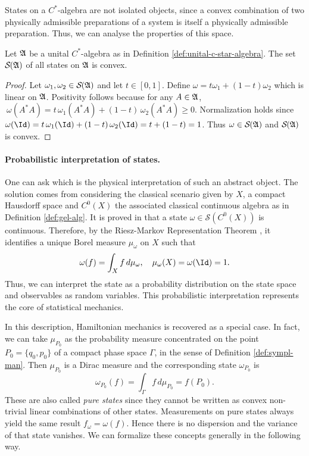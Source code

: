	States on a $C^*$-algebra are not isolated objects, since a convex combination of two physically admissible preparations of a system is itself a physically admissible preparation. Thus, we can analyse the properties of this space.
	
	\begin{proposition}\label{prop:state-convex}
		Let $\mathfrak{A}$ be a unital $C^*$-algebra as in Definition \ref{def:unital-c-star-algebra}. The set $\mathcal{S}(\A)$ of all states on $\mathfrak{A}$ is convex.
	\end{proposition}
	
	\begin{proof}
		Let $\omega_1,\omega_2 \in \mathcal{S}(\A)$ and let $t \in [0,1]$. Define $\omega = t\omega_1 + (1-t)\omega_2$ which is linear on $\mathfrak{A}$. Positivity follows because for any $A\in\mathfrak{A}$, $\ \omega(A^*A) = t\,\omega_1(A^*A) + (1-t)\,\omega_2(A^*A) \ge 0$.
		Normalization holds since $\omega(\Id) = t\,\omega_1(\Id) + (1-t)\,\omega_2(\Id) = t + (1-t) = 1$. Thus $\omega \in \mathcal{S}(\A)$ and $\mathcal{S}(\A)$ is convex.
	\end{proof}
	
	\paragraph{Probabilistic interpretation of states.}
	
	One can ask which is the physical interpretation of such an abstract object. The solution comes from considering the classical scenario given by $X$, a compact Hausdorff space and $C^0(X)$ the associated classical continuous algebra as in Definition \ref{def:gel-alg}. It is proved in \cite[Proposition 2.3.11]{bratteliOperatorAlgebrasQuantum} that a state $\omega \in \mathcal{S}(C^0(X))$ is continuous. Therefore, by the Riesz-Markov Representation Theorem \cite[Theorem IV.14]{reedMethodsModernMathematical2003}, it identifies a unique Borel measure $\mu_\omega$ on $X$ such that
	\begin{equation}
		\omega(f) = \int_X f \, d\mu_\omega, \quad \mu_\omega(X) = \omega(\Id) = 1.
	\end{equation}
	Thus, we can interpret the state as a probability distribution on the state space and observables as random variables. This probabilistic interpretation represents the core of statistical mechanics.
	
	In this description, Hamiltonian mechanics is recovered as a special case. In fact, we can take $\mu_{P_0}$ as the probability measure concentrated on the point $P_0 = \{q_0, p_0\}$ of a compact phase space $\Gamma$, in the sense of Definition \ref{def:sympl-man}. Then $\mu_{P_0}$ is a Dirac measure and the corresponding state $\omega_{P_0}$ is
	\begin{equation}
		\omega_{P_0}(f) = \int_\Gamma f \, d\mu_{P_0} = f(P_0).
	\end{equation}
	These are also called \textit{pure states} since they cannot be written as convex non-trivial linear combinations of other states. Measurements on pure states always yield the same result $f_\omega = \omega(f)$. Hence there is no dispersion and the variance of that state vanishes. We can formalize these concepts generally in the following way.
	
